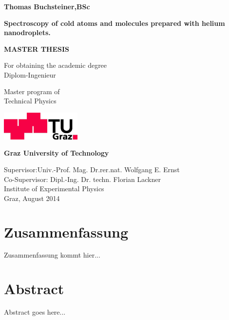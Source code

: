 \documentclass[parskip,12pt,headsepline,a4paper] {scrbook}
\begin{document}
\begin{titlepage}
\begin{center}
{\large \textbf{Thomas Buchsteiner,BSc}}

\vspace{1.5cm}

\begin{Large}
\textbf{Spectroscopy of cold atoms and molecules prepared with helium nanodroplets.}
\end{Large}

\vspace{1cm}

{\Large \textbf{MASTER THESIS}}

\vspace{0.5cm}

For obtaining the academic degree \\
Diplom-Ingenieur

\vspace{0.5cm}

Master program of \\
Technical Physics

\vspace{2cm}

\includegraphics{logo-tu.png}

\textbf{Graz University of Technology}

\vspace{1.5cm}

Supervisor:Univ.-Prof. Mag. Dr.rer.nat. Wolfgang E. Ernst \\
Co-Supervisor: Dipl.-Ing. Dr. techn. Florian Lackner\\
\vspace{0.5cm}
Institute of Experimental Physics\\
\vspace{1cm}
Graz, August 2014

\end{center}
\end{titlepage}


\section*{Zusammenfassung}
Zusammenfassung kommt hier...
\newpage

\section*{Abstract}
Abstract goes here...
\newpage
\end{document}

